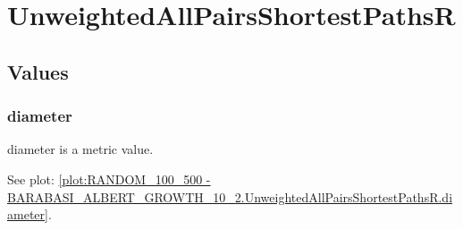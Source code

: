 %
%
\section{UnweightedAllPairsShortestPathsR}

\subsection{Values}
\subsubsection{diameter}
diameter is a metric value.

See plot: \ref{plot:RANDOM_100_500 - BARABASI_ALBERT_GROWTH_10_2.UnweightedAllPairsShortestPathsR.diameter}.

